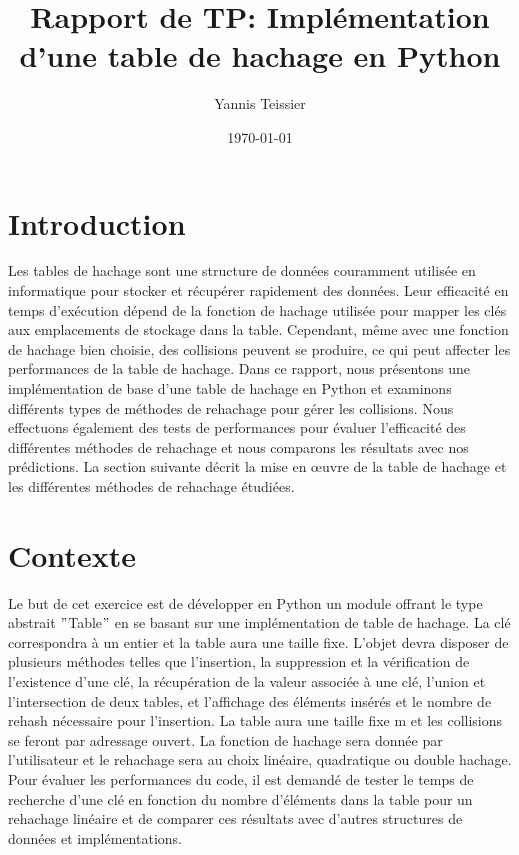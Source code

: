 \documentclass[12pt]{article}
\title{Rapport de TP: Implémentation d'une table de hachage en Python}
\author{Yannis Teissier}
\date{\today}
\begin{document}
    \maketitle
    \tableofcontents

    \section{Introduction}\label{sec:introduction}
    Les tables de hachage sont une structure de données couramment utilisée en informatique pour stocker et récupérer rapidement des données.
    Leur efficacité en temps d'exécution dépend de la fonction de hachage utilisée pour mapper les clés aux emplacements de stockage dans la table.
    Cependant, même avec une fonction de hachage bien choisie, des collisions peuvent se produire, ce qui peut affecter les performances de la table de hachage.
    Dans ce rapport, nous présentons une implémentation de base d'une table de hachage en Python et examinons différents types de méthodes de rehachage pour gérer les collisions.
    Nous effectuons également des tests de performances pour évaluer l'efficacité des différentes méthodes de rehachage et nous comparons les résultats avec nos prédictions.
    La section suivante décrit la mise en œuvre de la table de hachage et les différentes méthodes de rehachage étudiées.

    \section{Contexte}\label{sec:Contexte}
    Le but de cet exercice est de développer en Python un module offrant le type abstrait \("\)Table\("\) en se basant sur une implémentation de table de hachage.
    La clé correspondra à un entier et la table aura une taille fixe.
    L'objet devra disposer de plusieurs méthodes telles que l'insertion, la suppression et la vérification de l'existence d'une clé, la récupération de la valeur associée à une clé, l'union et l'intersection de deux tables, et l'affichage des éléments insérés et le nombre de rehash nécessaire pour l'insertion.
    La table aura une taille fixe m et les collisions se feront par adressage ouvert.
    La fonction de hachage sera donnée par l'utilisateur et le rehachage sera au choix linéaire, quadratique ou double hachage.
    Pour évaluer les performances du code, il est demandé de tester le temps de recherche d'une clé en fonction du nombre d'éléments dans la table pour un rehachage linéaire et de comparer ces résultats avec d'autres structures de données et implémentations.
\end{document}

